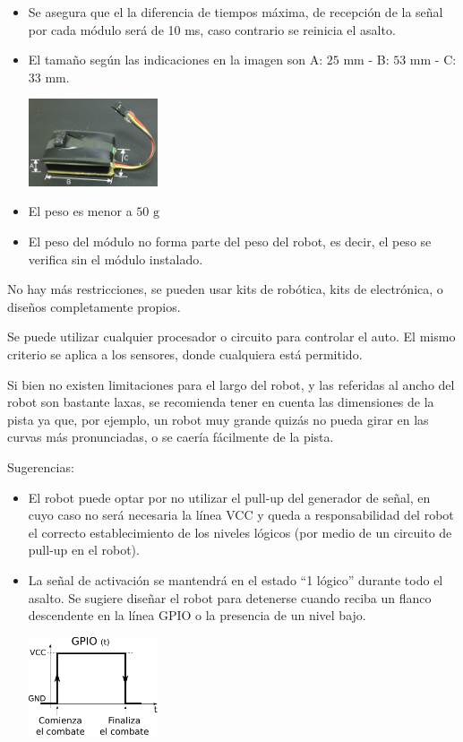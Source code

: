 \documentclass[a4paper,11pt]{article}
\newcommand{\mm}{\ensuremath{\mbox{~mm}}}
\newcommand{\gramos}{\ensuremath{\mbox{~g}}}
\begin{document}
\begin{itemize}
  \item Se asegura que el la diferencia de tiempos máxima, de recepción de la señal por cada módulo será de 10 ms, caso contrario se reinicia el asalto.
  \item El tamaño según las indicaciones en la imagen son A: $25\mm$ - B: $53\mm$ - C: $33\mm$.
  \begin{center}
    \includegraphics[width=0.3\textwidth]{signal_starter_img}
  \end{center}
  \item El peso es menor a $50\gramos$
  \item El peso del módulo no forma parte del peso del robot, es decir, el peso se verifica sin el módulo instalado.
\end{itemize}

No hay más restricciones, se pueden usar kits de robótica, kits de electrónica, o diseños completamente propios.

Se puede utilizar cualquier procesador o circuito para controlar el auto. El mismo criterio se aplica a los sensores, donde cualquiera está permitido.

Si bien no existen limitaciones para el largo del robot, y las referidas al ancho del robot son bastante laxas, se recomienda tener en cuenta las dimensiones de la pista ya que, por ejemplo, un robot muy grande quizás no pueda girar en las curvas más pronunciadas, o se caería fácilmente de la pista.

Sugerencias:
\begin{itemize}
  \item El robot puede optar por no utilizar el pull-up del generador de señal, en cuyo caso no será necesaria la línea VCC y queda a responsabilidad del robot el correcto establecimiento de los niveles lógicos (por medio de un circuito de pull-up en el robot).
  \item La señal de activación se mantendrá en el estado ``1 lógico'' durante todo el asalto. Se sugiere diseñar el robot para detenerse cuando reciba un flanco descendente en la línea GPIO o la presencia de un nivel bajo.
  \begin{center}
    \includegraphics[width=0.3\textwidth]{signalstarter_tiempos}
  \end{center}
\end{itemize}
\end{document}
